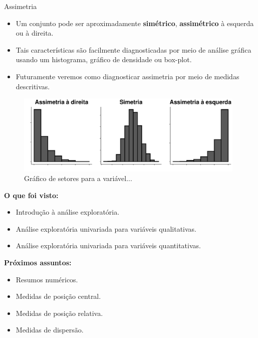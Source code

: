 \documentclass[
  ignorenonframetext,
  serif,
  professionalfont,
  usenames,
  dvipsnames,
  aspectratio = 169]{beamer}
\providecommand{\tightlist}{%
  \setlength{\itemsep}{0pt}\setlength{\parskip}{0pt}}
\renewcommand{\tightlist}{%
  \setlength{\itemsep}{0\baselineskip}
  \setlength{\parskip}{0.25\baselineskip}
}
\def\beginAHalfColumn{\begin{minipage}{0.49\textwidth}}%
\def\endColumns{\end{minipage}}%
\begin{document}
\begin{frame}{Assimetria}
\protect\hypertarget{assimetria}{}
\begin{itemize}
\item
  Um conjunto pode ser aproximadamente \textbf{simétrico},
  \textbf{assimétrico} à esquerda ou à direita.
\item
  Tais características são facilmente diagnosticadas por meio de análise
  gráfica usando um histograma, gráfico de densidade ou box-plot.
\item
  Futuramente veremos como diagnosticar assimetria por meio de medidas
  descritivas.
\end{itemize}

\begin{figure}

{\centering \includegraphics[width=11cm]{200-exploratoria-uni-tabelas-graficos_files/figure-beamer/unnamed-chunk-26-1} 

}

\caption{Gráfico de setores para a variável...}\label{fig:unnamed-chunk-26}
\end{figure}
\end{frame}

\begin{frame}{}
\protect\hypertarget{section}{}
\beginAHalfColumn

\textbf{O que foi visto:}

\begin{itemize}
\tightlist
\item
  Introdução à análise exploratória.
\item
  Análise exploratória univariada para variáveis qualitativas.
\item
  Análise exploratória univariada para variáveis quantitativas.
\end{itemize}

\endColumns
\beginAHalfColumn

\textbf{Próximos assuntos:}

\begin{itemize}
\tightlist
\item
  Resumos numéricos.
\item
  Medidas de posição central.
\item
  Medidas de posição relativa.
\item
  Medidas de dispersão.
\end{itemize}

\endColumns
\end{frame}
\end{document}
